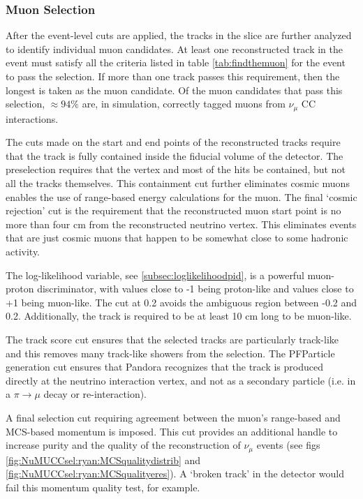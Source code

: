 \subsubsection{Muon Selection}
\label{sssec:NuMUCCsel:constr:muonsel}

\par After the event-level cuts are applied, the tracks in the slice are further analyzed to identify individual muon candidates. At least one reconstructed track in the event must satisfy all the criteria listed in table \ref{tab:findthemuon} for the event to pass the selection. If more than one track passes this requirement, then the longest is taken as the muon candidate. Of the muon candidates that pass this selection, $\approx 94\%$ are, in simulation, correctly tagged muons from $\nu_{\mu}$ CC interactions.

\par The cuts made on the start and end points of the reconstructed tracks require that the track is fully contained inside the fiducial volume of the detector. The preselection requires that the vertex and most of the hits be contained, but not all the tracks themselves. This containment cut further eliminates cosmic muons enables the use of range-based energy calculations for the muon. The final `cosmic rejection' cut is the requirement that the reconstructed muon start point is no more than four cm from the reconstructed neutrino vertex. This eliminates events that are just cosmic muons that happen to be somewhat close to some hadronic activity. 

\par The log-likelihood variable, see \cref{subsec:loglikelihoodpid}, is a powerful muon-proton discriminator, with values close to -1 being proton-like and values close to +1 being muon-like. The cut at 0.2 avoids the ambiguous region between -0.2 and 0.2. Additionally, the track is required to be at least 10 cm long to be muon-like.

\par The track score cut ensures that the selected tracks are particularly track-like and this removes many track-like showers from the selection.  The PFParticle generation cut ensures that Pandora recognizes that the track is produced directly at the neutrino interaction vertex, and not as a secondary particle (i.e. in a $\pi \rightarrow \mu$ decay or re-interaction). 

\par A final selection cut requiring agreement between the muon's range-based and MCS-based momentum is imposed. This cut provides an additional handle to increase purity and the quality of the reconstruction of $\nu_{\mu}$ events (see figs \ref{fig:NuMUCCsel:ryan:MCSqualitydistrib} and \ref{fig:NuMUCCsel:ryan:MCSqualityeres}). A `broken track' in the detector would fail this momentum quality test, for example. 

